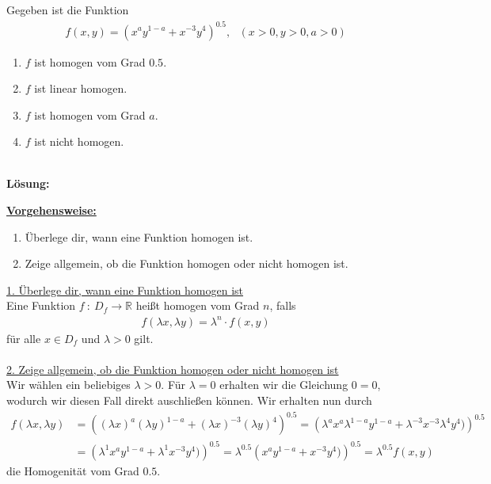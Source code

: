 \subsection*{}
Gegeben ist die Funktion 
\begin{align*}
f(x,y) = \left( x^a y^{1-a} + x^{-3} y^4 \right)^{0.5}, \ \ \
(x > 0, y>0,a>0)
\end{align*}
\renewcommand{\labelenumi}{(\alph{enumi})}
\begin{enumerate}
\item $f$ ist homogen vom Grad $0.5$.
\item $f$ ist linear homogen.
\item $f$ ist homogen vom Grad $a$.
\item $f$ ist nicht homogen.
\end{enumerate}
\ \\
\textbf{Lösung:}
\begin{mdframed}
\underline{\textbf{Vorgehensweise:}}
\renewcommand{\labelenumi}{\theenumi.}
\begin{enumerate}
\item Überlege dir, wann eine Funktion homogen ist.
\item Zeige allgemein, ob die Funktion homogen oder nicht homogen ist.
\end{enumerate}
\end{mdframed}

\underline{1. Überlege dir, wann eine Funktion homogen ist} \\
Eine Funktion $f \ : \ D_f  \to \mathbb{R}$ heißt homogen vom Grad $n$, falls
\begin{align*}
f(\lambda x, \lambda y) = \lambda^n \cdot f(x,y)
\end{align*}
für alle $x \in D_f$ und $\lambda > 0$ gilt.
\\
\\

\underline{2. Zeige allgemein, ob die Funktion homogen oder nicht homogen ist}\\
Wir wählen ein beliebiges $\lambda >0 $. 
Für $\lambda = 0 $ erhalten wir die Gleichung $0 = 0$, wodurch wir diesen Fall direkt auschließen können.
Wir erhalten nun durch
\begin{align*}
f( \lambda x , \lambda y )
&=
\left((\lambda x)^a (\lambda y)^{1-a}
+ (\lambda x)^{-3} (\lambda y)^4\right)^{0.5}
= 
\left(\lambda^a x^a \lambda^{1-a} y^{1-a}
+ \lambda^{-3} x^{-3} \lambda^4 y^4)\right)^{0.5}\\
&=
\left(\lambda^1 x^a  y^{1-a}
+ \lambda^1 x^{-3}  y^4)\right)^{0.5}
=
\lambda^{0.5} \left(x^a  y^{1-a}
+  x^{-3}  y^4)\right)^{0.5}
= \lambda^{0.5} f(x,y)
\end{align*}
die Homogenität vom Grad $0.5$.

